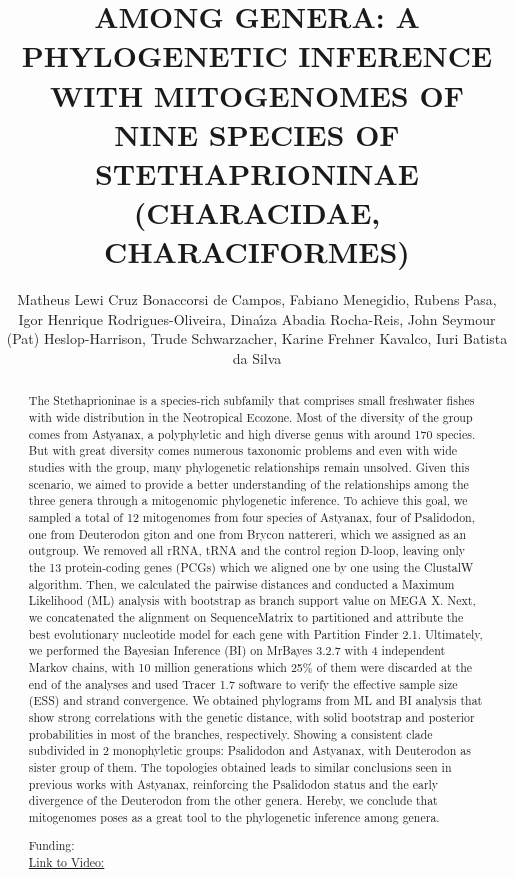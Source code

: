 \documentclass[twoside]{article}
\title{\vspace{-15mm}\fontsize{24pt}{10pt}\selectfont\textbf{ AMONG GENERA: A PHYLOGENETIC INFERENCE WITH MITOGENOMES OF NINE SPECIES OF STETHAPRIONINAE (CHARACIDAE,  CHARACIFORMES) }} %
\author{ Matheus Lewi Cruz Bonaccorsi de Campos,  Fabiano Menegidio,  Rubens Pasa,  Igor Henrique Rodrigues-Oliveira,  Dina\'{\i}za Abadia Rocha-Reis,  John Seymour (Pat) Heslop-Harrison,  Trude Schwarzacher,  Karine Frehner Kavalco,  Iuri Batista da Silva }
\affil{ UNIVERSIDADE DE MOGI DAS CRUZES,  UNIVERSIDADE FEDERAL DE MINAS GERAIS }
\date{}
\begin{document}
  
  
  \maketitle %
  
  
  \thispagestyle{fancy} %
  
  
  \begin{abstract}
  The Stethaprioninae is a species-rich subfamily that comprises small freshwater fishes with wide distribution in the Neotropical Ecozone. Most of the diversity of the group comes from Astyanax,  a polyphyletic and high diverse genus with around 170 species. But with great diversity comes numerous taxonomic problems and even with wide studies with the group,  many phylogenetic relationships remain unsolved. Given this scenario,  we aimed to provide a better understanding of the relationships among the three genera through a mitogenomic phylogenetic inference. To achieve this goal,  we sampled a total of 12 mitogenomes from four species of Astyanax,  four of Psalidodon,  one from Deuterodon giton and one from Brycon nattereri,  which we assigned as an outgroup. We removed all rRNA,  tRNA and the control region D-loop,  leaving only the 13 protein-coding genes (PCGs) which we aligned one by one using the ClustalW algorithm. Then,  we calculated the pairwise distances and conducted a Maximum Likelihood (ML) analysis with bootstrap as branch support value on MEGA X. Next,  we concatenated the alignment on SequenceMatrix to partitioned and attribute the best evolutionary nucleotide model for each gene with Partition Finder 2.1. Ultimately,  we performed the Bayesian Inference (BI) on MrBayes 3.2.7 with 4 independent Markov chains,  with 10 million generations which 25\% of them were discarded at the end of the analyses and used Tracer 1.7 software to verify the effective sample size (ESS) and strand convergence. We obtained phylograms from ML and BI analysis that show strong correlations with the genetic distance,  with solid bootstrap and posterior probabilities in most of the branches,  respectively. Showing a consistent clade subdivided in 2 monophyletic groups: Psalidodon and Astyanax,  with Deuterodon as sister group of them. The topologies obtained leads to similar conclusions seen in previous works with Astyanax,  reinforcing the Psalidodon status and the early divergence of the Deuterodon from the other genera. Hereby,  we conclude that mitogenomes poses as a great tool to the phylogenetic inference among genera.
  
  Funding:   \\
  \href{http://ab3c.org.br/xpress_pres2020/xmxp2020-301463.html}{Link to Video:}

  \end{abstract}
   
  
\end{document}
